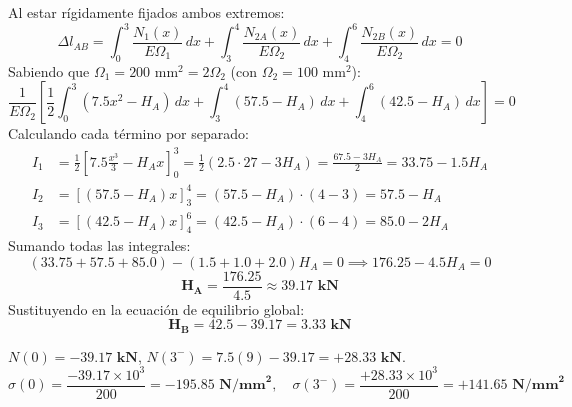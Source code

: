 {    Al estar rígidamente fijados ambos extremos:
    \begin{equation}
        \Delta l_{AB} = \int_0^3 \frac{N_1(x)}{E \Omega_1} \, dx + \int_3^4 \frac{N_{2A}(x)}{E \Omega_2} \, dx + \int_4^6 \frac{N_{2B}(x)}{E \Omega_2} \, dx = 0
    \end{equation}
    Sabiendo que $\Omega_1 = 200\text{ mm}^2 = 2 \Omega_2$ (con $\Omega_2 = 100\text{ mm}^2$):
    \begin{equation}
        \frac{1}{E \Omega_2} \left[ \frac{1}{2} \int_0^3 (7.5x^2 - H_A) \, dx + \int_3^4 (57.5 - H_A) \, dx + \int_4^6 (42.5 - H_A) \, dx \right] = 0
    \end{equation}
    Calculando cada término por separado:
    \begin{align}
        I_1 & = \frac{1}{2} \left[ 7.5 \frac{x^3}{3} - H_A x \right]_0^3 = \frac{1}{2} \left( 2.5 \cdot 27 - 3H_A \right) = \frac{67.5 - 3H_A}{2} = 33.75 - 1.5H_A \\
        I_2 & = \left[ (57.5 - H_A)x \right]_3^4 = (57.5 - H_A) \cdot (4 - 3) = 57.5 - H_A                                                                         \\
        I_3 & = \left[ (42.5 - H_A)x \right]_4^6 = (42.5 - H_A) \cdot (6 - 4) = 85.0 - 2H_A
    \end{align}
    Sumando todas las integrales:
    \begin{equation}
        (33.75 + 57.5 + 85.0) - (1.5 + 1.0 + 2.0) H_A = 0 \implies 176.25 - 4.5 H_A = 0
    \end{equation}
    \begin{equation}
        \mathbf{H_A = \frac{176.25}{4.5} \approx 39.17\text{ kN}}
    \end{equation}
    Sustituyendo en la ecuación de equilibrio global:
    \begin{equation}
        \mathbf{H_B = 42.5 - 39.17 = 3.33\text{ kN}}
    \end{equation}


    $N(0) = \mathbf{-39.17\text{ kN}}$, $N(3^-) = 7.5(9) - 39.17 = \mathbf{+28.33\text{ kN}}$.
    \begin{equation}
        \sigma(0) = \frac{-39.17 \times 10^3}{200} = \mathbf{-195.85\text{ N/mm}^2}, \quad \sigma(3^-) = \frac{+28.33 \times 10^3}{200} = \mathbf{+141.65\text{ N/mm}^2}
    \end{equation}

}
